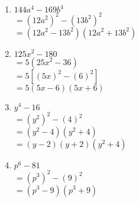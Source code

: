\begin{enumerate}[label = \Alph*. ]
\begin{multicols}{2}
\begin{enumerate}[label = \arabic*. ]
\item %
$ 144a^4-169b^4$\\
$=(12 a^{2})^2- (13 b^{2})^2 $\\
$= \left(12 a^{2} - 13 b^{2}\right) \left(12 a^{2} + 13 b^{2}\right)$

\item %
$125x^2-180 $\\
$=5(25x^2-36) $\\
$=5[(5 x)^2- (6)^2 ]$\\
$=5 \left(5 x - 6\right) \left(5 x + 6\right)$

\item %
$y^4-16 $\\
$=(y^2)^2- (4)^2 $\\
$=(y^2-4) (y^2+4) $\\
$=\left(y - 2\right) \left(y + 2\right) \left(y^{2} + 4\right)$

\item %
$p^6-81 $\\
$=(p^{3})^2- (9)^2 $\\
$= \left(p^{3} - 9\right) \left(p^{3} + 9\right)$


\end{enumerate}   


\end{multicols} 
\end{enumerate}  